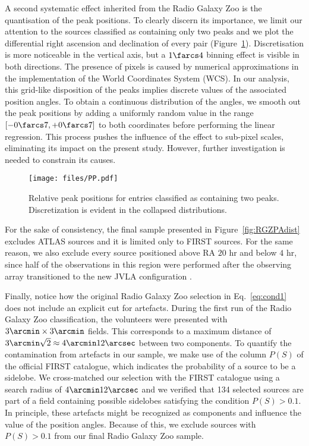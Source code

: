  	           
            A second systematic effect inherited from the Radio Galaxy Zoo is the quantisation of the peak positions. To clearly discern its importance, we limit our attention to the sources classified as containing only two peaks and we plot the differential right ascension and declination of every pair (Figure~\ref{fig:PP}). Discretisation is more noticeable in the vertical axis, but a $1\farcs4$ binning effect is visible in both directions. The presence of pixels is caused by numerical approximations in the implementation of the World Coordinates System (WCS).  
			In our analysis, this grid-like disposition of the peaks implies discrete values of the associated position angles. To obtain a continuous distribution of the angles, we smooth out the peak positions by adding a uniformly random value in the range $[-0\farcs7, +0\farcs7]$ to both coordinates before performing the linear regression. This process pushes the influence of the effect to sub-pixel scales, eliminating its impact on the present study. However, further investigation is needed to constrain its causes. 

		 	\begin{figure}
		 		\centering
		 		\texttt{[image: files/PP.pdf]}
		 		\caption{Relative peak positions for entries classified as containing two peaks. Discretization is evident in the collapsed distributions.}
		 		
		 		\label{fig:PP}
		 	\end{figure}
            For the sake of consistency, the final sample presented in Figure~\ref{fig:RGZPAdist} excludes ATLAS sources and it is limited only to FIRST sources. For the same reason, we also exclude every source positioned above RA $20$ hr and below $4$ hr, since half of the observations in this region were performed after the observing array transitioned to the new JVLA configuration \citep{Helfand2015b}. 
            
			Finally, notice how the original Radio Galaxy Zoo selection in Eq.~\eqref{eq:cond1} does not include an explicit cut for artefacts. During the first run of the Radio Galaxy Zoo classification, the volunteers were presented with $3\arcmin \times3\arcmin$ fields. This corresponds to a maximum distance of $ 3\arcmin \sqrt{2} \approx 4\arcmin 12\arcsec$ between two components. To quantify the contamination from artefacts in our sample, we make use of the column $P(S)$ of the official FIRST catalogue, which indicates the probability of a source to be a sidelobe. We cross-matched our selection with the FIRST catalogue using a search radius of $4\arcmin 12\arcsec$ and we verified that 134 selected sources are part of a field containing possible sidelobes satisfying the condition $P(S)>0.1$. In principle, these artefacts might be recognized as components and influence the value of the position angles. Because of this, we exclude sources with $P(S)>0.1$ from our final Radio Galaxy Zoo sample.
            
